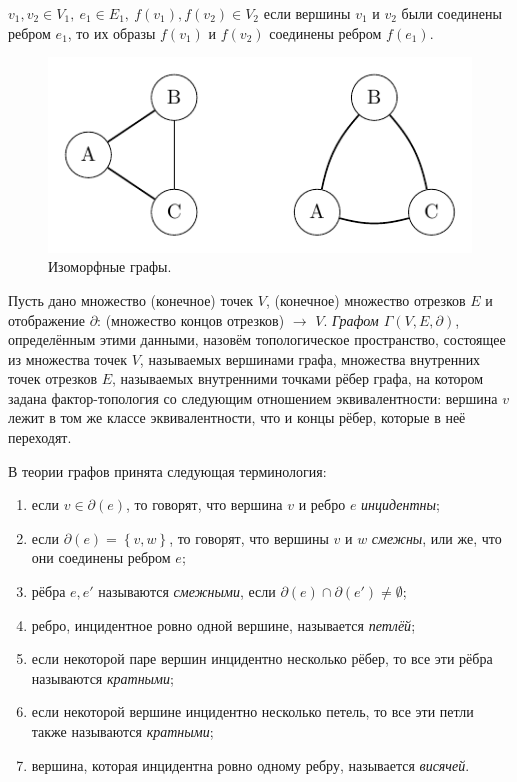 $v_1, v_2 \in V_1, \ e_1 \in E_1, \ f(v_1), f(v_2) \in V_2$ если вершины $v_1$ и $v_2$ были соединены ребром $e_1$, то их образы $f(v_1)$ и $f(v_2)$ соединены ребром $f(e_1)$.

\begin{figure}[h]
    \centering
    \includegraphics{images/c3.2.pdf}
    \caption{Изоморфные графы.}
    \label{fig:c3.2}
\end{figure}

\begin{definition}
    Пусть дано множество (конечное) точек $V$, (конечное) множество отрезков $E$ и отображение $\partial$: (множество концов отрезков) $\to$ $V$. \textit{Графом $\Gamma(V, E, \partial)$}, определённым этими данными, назовём топологическое пространство, состоящее из множества точек $V$, называемых вершинами графа, множества внутренних точек отрезков $E$, называемых внутренними точками рёбер графа, на котором задана фактор-топология со следующим отношением эквивалентности: вершина $v$ лежит в том же классе эквивалентности, что и концы рёбер, которые в неё переходят.
\end{definition}

В теории графов принята следующая терминология:
\begin{enumerate}
    \item если $v \in \partial(e)$, то говорят, что вершина $v$ и ребро $e$ \textit{инцидентны};
    \item если $\partial(e) = \left\{v,w\right\}$, то говорят, что вершины $v$ и $w$ \textit{смежны}, или же, что они соединены ребром $e$;
    \item рёбра $e, e'$ называются \textit{смежными}, если $\partial(e) \cap \partial(e') \neq \emptyset$;
    \item ребро, инцидентное ровно одной вершине, называется \textit{петлёй};
    \item если некоторой паре вершин инцидентно несколько рёбер, то все эти рёбра называются \textit{кратными};
    \item если некоторой вершине инцидентно несколько петель, то все эти петли также называются \textit{кратными};
    \item вершина, которая инцидентна ровно одному ребру, называется \textit{висячей}.
\end{enumerate}



